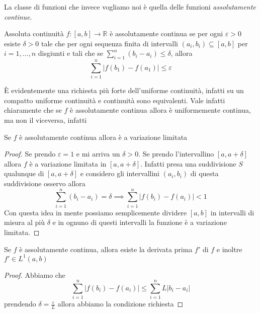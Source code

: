 La classe di funzioni che invece vogliamo noi è quella delle funzioni
\emph{assolutamente continue}.  
\begin{definition}{Assoluta continuità}
    \(f : [a, b] \to \mathbb{R}\)  è assolutamente continua se per ogni
    \(\varepsilon > 0\) esiste \(\delta > 0\) tale che per ogni sequenza finita
    di intervalli \({(a_{i}, b_{i})} \subseteq [a, b] \) per \(i = 1,\dots, n\)
    disgiunti e tali che se \(\displaystyle\sum_{i=1}^{n} {(b_{i} - a_{i})} \le
    \delta  \), allora
\[
    \sum_{i=1}^{n} \left| f{(b_{1})} - f{(a_{1})} \right| \le \varepsilon 
\]
\end{definition}
È evidentemente una richiesta più forte dell'uniforme continuità, infatti su un
compatto uniforme continuità e continuità sono equivalenti. Vale infatti
chiaramente che se \(f\) è assolutamente continua allora è uniformemente
continua, ma non il viceversa, infatti
\begin{proposition}
    Se \(f\) è assolutamente continua allora è a variazione limitata
\end{proposition}
\begin{proof}
Se prendo \(\varepsilon = 1\) e mi arriva un \(\delta > 0\). Se prendo
l'intervallino \([a, a+ \delta]\) allora \(f\) è a variazione limitata in \([a,
a+\delta]\). Infatti presa una suddivisione \(S\) qualunque di \([a,
a+\delta]\) e considero gli intervallini \({(a_{i}, b_{i})}\) di questa
suddivisione osservo allora
\[
    \sum_{i=1}^{n} {(b_{i} - a_{i})} = \delta \implies \sum_{i=1}^{n} \left|
    f{(b_{i})} - f{(a_{i})} \right| < 1
\]
Con questa idea in mente possiamo semplicemente dividere \([a,b]\) in intervalli
di misura al più \(\delta\) e in ognuno di questi intervalli la funzione è a
variazione limitata.
\end{proof}
\begin{proposition}
    Se \(f\) è assolutamente continua, allora esiste la derivata prima \(f'\) di
    \(f\) e inoltre \(f' \in L^{1}(a, b)\) 
\end{proposition}
\begin{proposition}
\end{proposition}
\begin{proof}
    Abbiamo che
\[
    \sum_{i=1}^{n} \left| f{(b_{i})} - f{(a_{i})} \right| \le \sum_{i=1}^{n} L
    |b_{i} - a_{i}|  
\]
    prendendo \(\delta = \frac{\varepsilon}{L}\) allora abbiamo la condizione
    richiesta
\end{proof}

